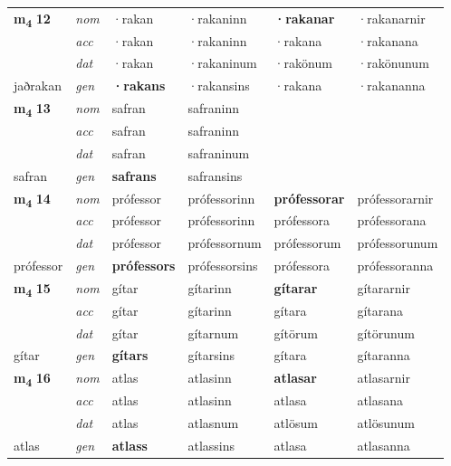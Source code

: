 \begin{longtable}[l]{X>{\footnotesize\itshape}XXXXX}
\multirow{3}{*}{{{\textbf{m{\textsubscript{4}}} \Large{\textbf{12}}}}}  
 & nom & ·rakan & ·rakaninn    & \textbf{·rakanar} & ·rakanarnir  \\*
 & acc & ·rakan  & ·rakaninn   & ·rakana  & ·rakanana \\*
 & dat & ·rakan & ·rakaninum   & ·rakönum & ·rakönunum \\*
 {\footnotesize{jaðrakan}} &  gen & \textbf{·rakans}  & ·rakansins  & ·rakana & ·rakananna \\
\cmidrule{1-6}


\multirow{3}{*}{{{\textbf{m{\textsubscript{4}}} \Large{\textbf{13}}}}}  
 & nom & safran & safraninn    & \textbf{} &   \\*
 & acc & safran  & safraninn   &   &  \\*
 & dat & safran & safraninum   &  &  \\*
 {\footnotesize{safran}} &  gen & \textbf{safrans}  & safransins  &  &  \\
\cmidrule{1-6}


\multirow{3}{*}{{{\textbf{m{\textsubscript{4}}} \Large{\textbf{14}}}}}  
 & nom & prófessor & prófessorinn    & \textbf{prófessorar} & prófessorarnir  \\*
 & acc & prófessor  & prófessorinn   & prófessora  & prófessorana \\*
 & dat & prófessor & prófessornum   & prófessorum & prófessorunum \\*
 {\footnotesize{prófessor}} &  gen & \textbf{prófessors}  & prófessorsins  & prófessora & prófessoranna \\
\cmidrule{1-6}


\multirow{3}{*}{{{\textbf{m{\textsubscript{4}}} \Large{\textbf{15}}}}}  
 & nom & gítar & gítarinn    & \textbf{gítarar} & gítararnir  \\*
 & acc & gítar  & gítarinn   & gítara  & gítarana \\*
 & dat & gítar & gítarnum   & gítörum & gítörunum \\*
 {\footnotesize{gítar}} &  gen & \textbf{gítars}  & gítarsins  & gítara & gítaranna \\
\cmidrule{1-6}


\multirow{3}{*}{{{\textbf{m{\textsubscript{4}}} \Large{\textbf{16}}}}}  
 & nom & atlas & atlasinn    & \textbf{atlasar} & atlasarnir  \\*
 & acc & atlas  & atlasinn   & atlasa  & atlasana \\*
 & dat & atlas & atlasnum   & atlösum & atlösunum \\*
 {\footnotesize{atlas}} &  gen & \textbf{atlass}  & atlassins  & atlasa & atlasanna \\
\cmidrule{1-6}



\end{longtable}
